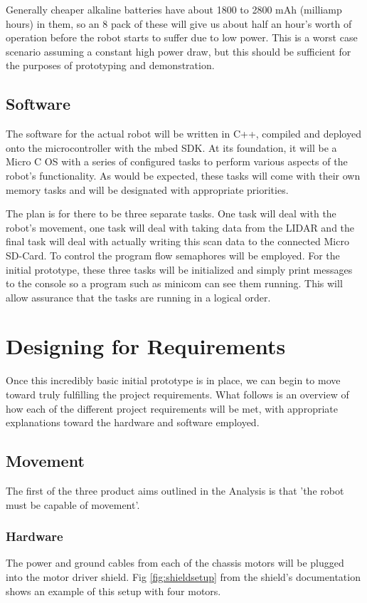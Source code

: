 			Generally cheaper alkaline batteries have about 1800 to 2800 mAh (milliamp hours) in them, so an 8 pack of these will give us about half an hour's worth of operation before the robot starts to suffer due to low power. This is a worst case scenario assuming a constant high power draw, but this should be sufficient for the purposes of prototyping and demonstration. 
			
			\subsection{Software}
			The software for the actual robot will be written in C++, compiled and deployed onto the microcontroller with the mbed SDK. At its foundation, it will be a Micro C OS with a series of configured tasks to perform various aspects of the robot's functionality. As would be expected, these tasks will come with their own memory tasks and will be designated with appropriate priorities. 
			
			The plan is for there to be three separate tasks. One task will deal with the robot's movement, one task will deal with taking data from the LIDAR and the final task will deal with actually writing this scan data to the connected Micro SD-Card. To control the program flow semaphores will be employed. For the initial prototype, these three tasks will be initialized and simply print messages to the console so a program such as minicom can see them running. This will allow assurance that the tasks are running in a logical order.
		
		\section{Designing for Requirements}
		Once this incredibly basic initial prototype is in place, we can begin to move toward truly fulfilling the project requirements. What follows is an overview of how each of the different project requirements will be met, with appropriate explanations toward the hardware and software employed.
		
			\subsection{Movement}
			The first of the three product aims outlined in the Analysis is that 'the robot must be capable of movement'.
				\subsubsection{Hardware}
				The power and ground cables from each of the chassis motors will be plugged into the motor driver shield. Fig \ref{fig:shieldsetup} from the shield's documentation shows an example of this setup with four motors.
				
